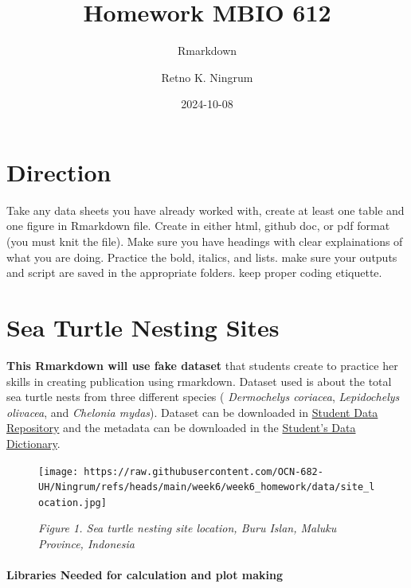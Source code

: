 \documentclass[
]{article}
\title{Homework MBIO 612}
\subtitle{Rmarkdown}
\author{Retno K. Ningrum}
\date{2024-10-08}
\begin{document}
\maketitle

{
\setcounter{tocdepth}{2}
\tableofcontents
}
\hypertarget{direction}{%
\section{Direction}\label{direction}}

Take any data sheets you have already worked with, create at least one
table and one figure in Rmarkdown file. Create in either html, github
doc, or pdf format (you must knit the file). Make sure you have headings
with clear explainations of what you are doing. Practice the bold,
italics, and lists. make sure your outputs and script are saved in the
appropriate folders. keep proper coding etiquette.

\hypertarget{sea-turtle-nesting-sites}{%
\section{Sea Turtle Nesting Sites}\label{sea-turtle-nesting-sites}}

\textbf{This Rmarkdown will use fake dataset} that students create to
practice her skills in creating publication using rmarkdown. Dataset
used is about the total sea turtle nests from three different species (
\emph{Dermochelys coriacea}, \emph{Lepidochelys olivacea}, and
\emph{Chelonia mydas}). Dataset can be downloaded in
\href{https://github.com/OCN-682-UH/Ningrum/blob/main/week6/week6_homework/data/RetnoNingrum_NestingTurtle_MBIO612.csv}{Student
Data Repository} and the metadata can be downloaded in the
\href{https://github.com/OCN-682-UH/Ningrum/blob/main/week6/week6_homework/data/RetnoNingrum_DataDictionary_MBIO612.csv}{Student's
Data Dictionary}.

\begin{figure}
\centering
\texttt{[image: https://raw.githubusercontent.com/OCN-682-UH/Ningrum/refs/heads/main/week6/week6\_homework/data/site\_location.jpg]}
\caption{\emph{Figure 1. Sea turtle nesting site location, Buru Islan,
Maluku Province, Indonesia}}
\end{figure}

\hypertarget{libraries-needed-for-calculation-and-plot-making}{%
\paragraph{Libraries Needed for calculation and plot
making}\label{libraries-needed-for-calculation-and-plot-making}}
\end{document}

